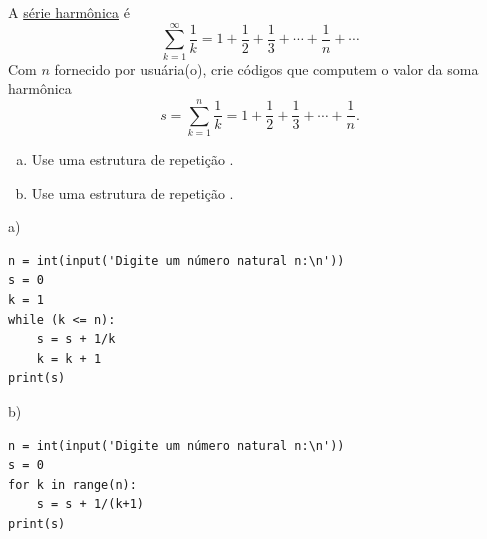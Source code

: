 \begin{exer}
  A \href{https://pt.wikipedia.org/wiki/S\%C3\%A9rie_harm\%C3\%B3nica_(matem\%C3\%A1tica)}{série harmônica} é
  \begin{equation}
    \sum_{k=1}^\infty \frac{1}{k} = 1 + \frac{1}{2} + \frac{1}{3} + \cdots + \frac{1}{n} + \cdots
  \end{equation}
  Com $n$ fornecido por usuária(o), crie códigos que computem o valor da soma harmônica
  \begin{equation}
    s = \sum_{k=1}^n \frac{1}{k} = 1 + \frac{1}{2} + \frac{1}{3} + \cdots + \frac{1}{n}.
  \end{equation}
  \begin{enumerate}[a)]
  \item Use uma estrutura de repetição {\PYTHONwhile}.
  \item Use uma estrutura de repetição {\PYTHONfor}.
  \end{enumerate}
\end{exer}
\begin{resp}
a)

\begin{lstlisting}
n = int(input('Digite um número natural n:\n'))
s = 0
k = 1
while (k <= n):
    s = s + 1/k
    k = k + 1
print(s)
\end{lstlisting}

b)

\begin{lstlisting}
n = int(input('Digite um número natural n:\n'))
s = 0
for k in range(n):
    s = s + 1/(k+1)
print(s)
\end{lstlisting}

\end{resp}

